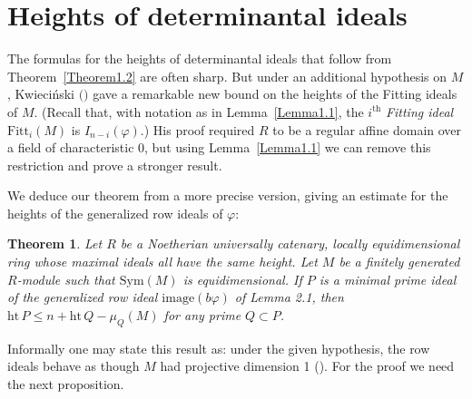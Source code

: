 \documentclass{proc-l}
\newcommand{\myth}{\mathrm{th}}
\newcommand{\Fitt}{\mathrm{Fitt}}
\newcommand{\hgt}{\mathrm{ht}}
\newcommand{\Sym}{\mathrm{ Sym}}
\newcommand{\image}{\mathrm{ image}}
\newtheorem{Theorem}{Theorem}[section]
\theoremstyle{remark}
\theoremstyle{definition}
\begin{document}
\section{Heights of determinantal ideals}


The formulas for the heights of determinantal ideals that follow from
Theorem~\ref{Theorem1.2} are often sharp. But under an additional hypothesis 
on $M$, Kwieci\'nski $($\cite[Theorem~1]{K}$)$ 
gave a remarkable new bound on the
heights of the Fitting ideals of $M$. (Recall that, with notation
as in Lemma~\ref{Lemma1.1}, the $i^{\myth}$ {\it Fitting ideal\/}
$\Fitt_i(M)$ is  $I_{n-i}(\varphi)$.) His proof required $R$ to
be a regular affine domain over a field of characteristic 0, 
but using Lemma~\ref{Lemma1.1} we can remove this restriction and prove
a stronger result.

We deduce our theorem from a more precise version, giving
an estimate for the heights of the generalized row ideals of $\varphi$:

\begin{Theorem}\label{Theorem3.1} 
Let $R$ be a Noetherian universally catenary, locally equidimensional ring
whose maximal
ideals all have the same height. Let $M$ be a finitely generated
$R$-module such that
$\Sym(M)$ is equidimensional.  If $P$ is a minimal prime ideal of the
generalized row ideal $\image(b\varphi)$   of Lemma 2.1, then
$\hgt \, P \leq n+\hgt\, Q -\mu_Q(M)$ for any prime $Q\subset P$.
\end{Theorem}

Informally one may state this result as: under the given hypothesis, the row
ideals behave as though $M$ had  projective dimension 1 (\cite[Corollary 2.12
and Theorem 2.6]{HR}). For the proof we need the next proposition.  
\end{document}
